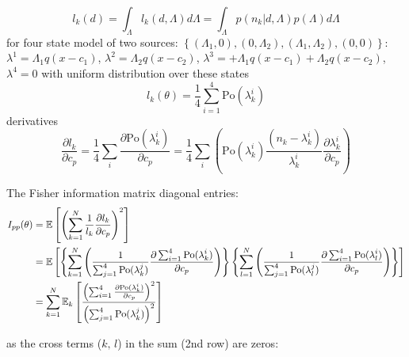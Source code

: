 \begin{equation}
	l_{k}(d)=\int_{\Lambda}l_{k}(d,\Lambda)d\Lambda=\int_{\Lambda}p(n_{k}|d,\Lambda)p(\Lambda)d\Lambda
\end{equation}
%
for four state model of two sources: $\left\{ (\Lambda_{1},0),(0,\Lambda_{2}),(\Lambda_{1},\Lambda_{2}),(0,0)\right\} $: $\lambda^{1}=\Lambda_{1}q(x-c_{1})$, $\lambda^{2}=\Lambda_{2}q(x-c_{2})$, $\lambda^{3}=+\Lambda_{1}q(x-c_{1})+\Lambda_{2}q(x-c_{2})$, $\lambda^{4}=0$ with uniform distribution over these states
%
\begin{equation}
	l_{k}(\theta)=\frac{1}{4}\sum_{i=1}^{4}\mathrm{Po}(\lambda_{k}^{i})
\end{equation}
%
derivatives 
%
\begin{equation}
	\frac{\partial l_{k}}{\partial c_{p}}=\frac{1}{4}\sum_{i}\frac{\partial\mathrm{Po}(\lambda_{k}^{i})}{\partial c_{p}}=\frac{1}{4}\sum_{i}\left(\mathrm{Po}(\lambda_{k}^{i})\frac{(n_{k}-\lambda_{k}^{i})}{\lambda_{k}^{i}}\frac{\partial\lambda_{k}^{i}}{\partial c_{p}}\right)
\end{equation}

The Fisher information matrix diagonal entries:
%
\begin{alignat}{1}
	I_{pp}(\theta) & =\mathbb{E}\left[\left(\sum_{k=1}^{N}\frac{1}{l_{k}}\frac{\partial l_{k}}{\partial c_{p}}\right)^{2}\right]\nonumber \\
	 & =\mathbb{E}\left[\left\{ \sum_{k=1}^{N}\left(\frac{1}{\sum_{j=1}^{4}\textrm{Po}(\lambda_{k}^{j})}\frac{\partial\sum_{i=1}^{4}\textrm{Po}(\textrm{\ensuremath{\lambda}}_{k}^{i})}{\partial c_{p}}\right)\right\} \left\{ \sum_{l=1}^{N}\left(\frac{1}{\sum_{j=1}^{4}\textrm{Po}(\lambda_{l}^{j})}\frac{\partial\sum_{i=1}^{4}\textrm{Po}(\textrm{\ensuremath{\lambda}}_{l}^{i})}{\partial c_{p}}\right)\right\} \right]\nonumber \\
	 & =\sum_{k=1}^{N}\mathbb{E}_{k}\left[\frac{\left(\sum_{i=1}^{4}\frac{\partial\textrm{Po}(\textrm{\ensuremath{\lambda}}_{k}^{i})}{\partial c_{p}}\right)^{2}}{\left(\sum_{j=1}^{4}\textrm{Po}(\lambda_{k}^{j})\right)^{2}}\right]\label{eq:Fisher Info Integrated Out - diagonal entries}
\end{alignat}

as the cross terms ($k,\, l$) in the sum (2nd row) are zeros: 

